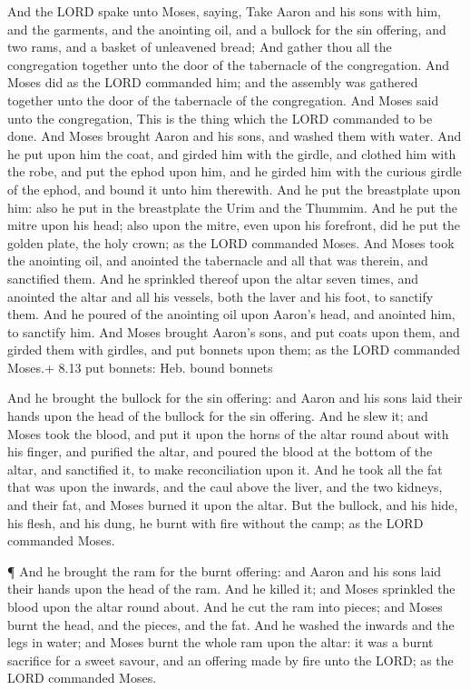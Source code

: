  And the LORD spake unto Moses, saying,  Take
Aaron and his sons with him, and the garments, and the anointing oil,
and a bullock for the sin offering, and two rams, and a basket of
unleavened bread;  And gather thou all the congregation
together unto the door of the tabernacle of the congregation.
 And Moses did as the LORD commanded him; and the assembly
was gathered together unto the door of the tabernacle of the
congregation.  And Moses said unto the congregation, This is
the thing which the LORD commanded to be done.  And Moses
brought Aaron and his sons, and washed them with water.  And
he put upon him the coat, and girded him with the girdle, and clothed
him with the robe, and put the ephod upon him, and he girded him with
the curious girdle of the ephod, and bound it unto him therewith.
 And he put the breastplate upon him: also he put in the
breastplate the Urim and the Thummim.  And he put the mitre
upon his head; also upon the mitre, even upon his forefront, did he put
the golden plate, the holy crown; as the LORD commanded Moses.
 And Moses took the anointing oil, and anointed the
tabernacle and all that was therein, and sanctified them. 
And he sprinkled thereof upon the altar seven times, and anointed the
altar and all his vessels, both the laver and his foot, to sanctify
them.  And he poured of the anointing oil upon Aaron's
head, and anointed him, to sanctify him.  And Moses brought
Aaron's sons, and put coats upon them, and girded them with girdles, and
put bonnets upon them; as the LORD commanded Moses.+ 8.13 put bonnets:
Heb. bound bonnets

 And he brought the bullock for the sin offering: and Aaron
and his sons laid their hands upon the head of the bullock for the sin
offering.  And he slew it; and Moses took the blood, and
put it upon the horns of the altar round about with his finger, and
purified the altar, and poured the blood at the bottom of the altar, and
sanctified it, to make reconciliation upon it.  And he took
all the fat that was upon the inwards, and the caul above the liver, and
the two kidneys, and their fat, and Moses burned it upon the altar.
 But the bullock, and his hide, his flesh, and his dung, he
burnt with fire without the camp; as the LORD commanded Moses.

 ¶ And he brought the ram for the burnt offering: and Aaron
and his sons laid their hands upon the head of the ram. 
And he killed it; and Moses sprinkled the blood upon the altar round
about.  And he cut the ram into pieces; and Moses burnt the
head, and the pieces, and the fat.  And he washed the
inwards and the legs in water; and Moses burnt the whole ram upon the
altar: it was a burnt sacrifice for a sweet savour, and an offering made
by fire unto the LORD; as the LORD commanded Moses.


